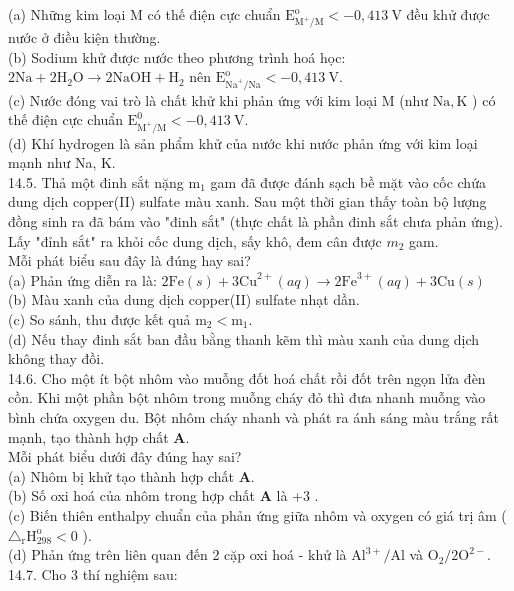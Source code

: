 \documentclass[10pt]{article}
\begin{document}
(a) Những kim loại M có thế điện cực chuẩn $\mathrm{E}_{\mathrm{M}^{+} / \mathrm{M}}^{\mathrm{o}}<-0,413 \mathrm{~V}$ đều khử được nước ở điều kiện thường.\\
(b) Sodium khử được nước theo phương trình hoá học: $2 \mathrm{Na}+2 \mathrm{H}_{2} \mathrm{O} \rightarrow 2 \mathrm{NaOH}+\mathrm{H}_{2}$ nên $\mathrm{E}_{\mathrm{Na}^{+} / \mathrm{Na}}^{\mathrm{o}}<-0,413 \mathrm{~V}$.\\
(c) Nước đóng vai trò là chất khử khi phản ứng với kim loại M (như $\mathrm{Na}, \mathrm{K}$ ) có thế điện cực chuẩn $\mathrm{E}_{\mathrm{M}^{+} / \mathrm{M}}^{0}<-0,413 \mathrm{~V}$.\\
(d) Khí hydrogen là sản phẩm khử của nước khi nước phản ứng với kim loại mạnh như Na, K.\\
14.5. Thả một đinh sắt nặng $\mathrm{m}_{1}$ gam đã được đánh sạch bề mặt vào cốc chứa dung dịch copper(II) sulfate màu xanh. Sau một thời gian thấy toàn bộ lượng đồng sinh ra đã bám vào "đinh sắt" (thực chất là phần đinh sắt chưa phản ứng). Lấy "đỉnh sắt" ra khỏi cốc dung dịch, sấy khô, đem cân được $m_{2}$ gam.\\
Mỗi phát biểu sau đây là đúng hay sai?\\
(a) Phản ứng diễn ra là: $2 \mathrm{Fe}(s)+3 \mathrm{Cu}^{2+}(a q) \rightarrow 2 \mathrm{Fe}^{3+}(a q)+3 \mathrm{Cu}(s)$\\
(b) Màu xanh của dung dịch copper(II) sulfate nhạt dần.\\
(c) So sánh, thu được kết quả $\mathrm{m}_{2}<\mathrm{m}_{1}$.\\
(d) Nếu thay đinh sắt ban đầu bằng thanh kẽm thì màu xanh của dung dịch không thay đồi.\\
14.6. Cho một ít bột nhôm vào muỗng đốt hoá chất rồi đốt trên ngọn lửa đèn cồn. Khi một phần bột nhôm trong muỗng cháy đỏ thì đưa nhanh muỗng vào bình chứa oxygen du. Bột nhôm cháy nhanh và phát ra ánh sáng màu trắng rất mạnh, tạo thành hợp chất $\mathbf{A}$.\\
Mỗi phát biểu dưới đây đúng hay sai?\\
(a) Nhôm bị khử tạo thành hợp chất $\mathbf{A}$.\\
(b) Số oxi hoá của nhôm trong hợp chất $\mathbf{A}$ là +3 .\\
(c) Biến thiên enthalpy chuẩn của phản ứng giữa nhôm và oxygen có giá trị âm ( $\triangle_{\mathrm{r}} \mathrm{H}_{298}^{\mathrm{o}}<0$ ).\\
(d) Phản ứng trên liên quan đến 2 cặp oxi hoá - khử là $\mathrm{Al}^{3+} / \mathrm{Al}$ và $\mathrm{O}_{2} / 2 \mathrm{O}^{2-}$.\\
14.7. Cho 3 thí nghiệm sau:
\end{document}
